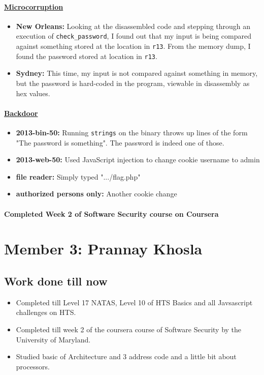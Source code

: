 \documentclass{article}
\def\code#1{\texttt{#1}}
\begin{document}
\begin{itemize}
        \paragraph{\href{http://microcorruption.com}{Microcorruption}}
        \begin{itemize}
            \item \textbf{New Orleans: }Looking at the disassembled code and
                stepping through an execution of \code{check\_password}, I found out
                that my input is being compared against something stored at the
                location in \code{r13}. From the memory dump, I found the password stored at location in
                \code{r13}.
            \item \textbf{Sydney: }This time, my input is not compared against
                something in memory, but the password is hard-coded in the
                program, viewable in disassembly as hex values.
        \end{itemize}
        \paragraph{\href{http://backdoor.sdslabs.co}{Backdoor}}
        \begin{itemize}
            \item \textbf{2013-bin-50: }Running \code{strings} on the binary throws
                up lines of the form "The password is something". The password
                is indeed one of those.
            \item \textbf{2013-web-50: }Used JavaScript injection to change
                cookie username to admin
            \item \textbf{file reader: }Simply typed ".../flag.php"
            \item \textbf{authorized persons only: }Another cookie change
        \end{itemize}

        \paragraph{} \textbf{Completed Week 2 of Software Security course on
        Coursera}

\newpage
\section*{Member 3: Prannay Khosla}
\subsection*{Work done till now}
\begin{itemize}
    \item Completed till Level 17 NATAS, Level 10 of HTS Basics and all Javsascript challenges on HTS.
    \item Completed till week 2 of the coursera course of Software Security by the  University of Maryland. 
    \item Studied basic of Architecture and 3 address code and a little bit about processors.
\end{itemize}

\end{itemize}
\end{document}
